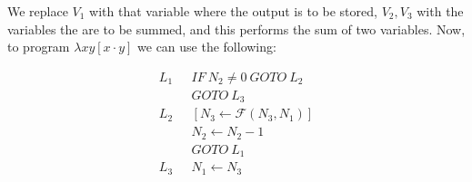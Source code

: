 \documentclass[a4paper, 12pt]{article}
\begin{document}
We replace $V_1$ with that variable where the output is to be stored, $V_2, V_3$
with the variables the are to be summed, and this performs the sum of two
variables. Now, to program $\lambda xy[x \cdot y]$ we can use the following:

\begin{align*}
    L_1 ~ ~ ~ & IF ~ N_2 \neq 0 ~ GOTO ~ L_2 \\ 
              & GOTO ~ L_3 \\ 
    L_2 ~ ~ ~ & \left[ N_3 \leftarrow \mathcal{F}(N_3, N_1) \right]  \\ 
              &N_2 \leftarrow  N_2 - 1 \\ 
              &GOTO ~ L_1 \\ 
    L_3 ~ ~ ~ &N_1 \leftarrow N_3
\end{align*}
\end{document}
